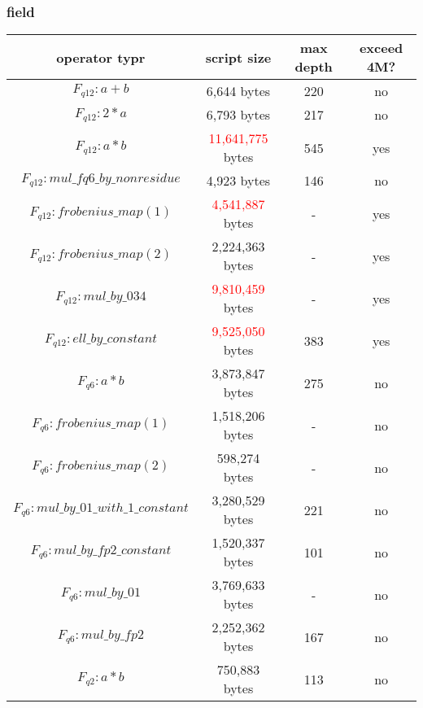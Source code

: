 \subsubsection{field}

\begin{center}
\begin{tabular}{|c|c|c|c|} \hline
operator typr & script size & max depth & exceed 4M? \\ \hline
$F_{q12}: a + b$ & 6,644 bytes & 220 & no  \\ \hline
$F_{q12}: 2 * a$ & 6,793 bytes & 217 & no \\ \hline
$F_{q12}: a * b$ & \textcolor{red}{11,641,775} bytes & 545 & yes \\ \hline
$F_{q12}: mul\_fq6\_by\_nonresidue$ & 4,923 bytes &	146 & no \\ \hline
$F_{q12}: frobenius\_map(1)$ & \textcolor{red}{4,541,887} bytes & - & yes \\ \hline
$F_{q12}: frobenius\_map(2)$ & 2,224,363 bytes & - & yes \\ \hline
$F_{q12}: mul\_by\_034$ & \textcolor{red}{9,810,459} bytes &	- & yes \\ \hline
$F_{q12}: ell\_by\_constant$ & \textcolor{red}{9,525,050} bytes & 383 & yes \\ \hline
$F_{q6}: a * b$ & 3,873,847 bytes &	275 & no \\ \hline
$F_{q6}: frobenius\_map(1)$ & 1,518,206 bytes &	- & no \\ \hline
$F_{q6}: frobenius\_map(2)$ & 598,274 bytes & - & no \\ \hline
$F_{q6}: mul\_by\_01\_with\_1\_constant$ & 3,280,529 bytes & 221 & no \\ \hline
$F_{q6}: mul\_by\_fp2\_constant$ & 1,520,337 bytes & 101 & no \\ \hline
$F_{q6}: mul\_by\_01$ & 3,769,633 bytes & - & no \\ \hline
$F_{q6}: mul\_by\_fp2$ & 2,252,362 bytes &	167 & no \\ \hline
$F_{q2}: a * b$ & 750,883 bytes & 113 & no \\ \hline

\end{tabular}
\end{center}

